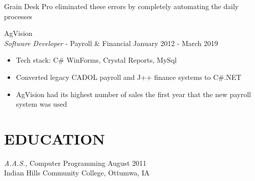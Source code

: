 \documentclass[line,margin]{res}
\begin{document}
\begin{resume}
\begin{itemize}
			Grain Desk Pro eliminated these errors by completely automating the daily processes 
	\end{itemize}
	AgVision \\
	{\sl Software Developer} - Payroll \& Financial \hfill January 2012 - March 2019
	\begin{itemize} 
		\item Tech stack: C\# WinForms, Crystal Reports, MySql
		\item Converted legacy CADOL payroll and J++ finance systems to C\#.NET
		\item AgVision had its highest number of sales the first year that the new payroll system was used
	\end{itemize}
           
\section{EDUCATION} {\sl A.A.S.,} Computer Programming \hfill August 2011 \\
Indian Hills Community College, Ottumwa, IA

\end{resume}
\end{document}
